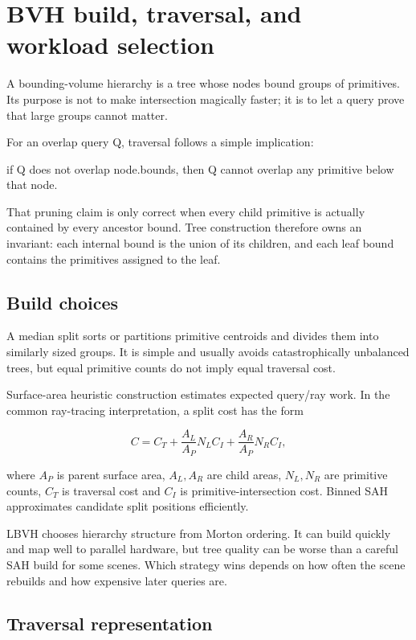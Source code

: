 \hypertarget{appendix-5653a7aea6bb}{}
\section{BVH build, traversal, and workload selection}\label{appendix-5653a7aea6bb-bvh-build-traversal-and-workload-selection}

A bounding-volume hierarchy is a tree whose nodes bound groups of primitives. Its purpose is not to make intersection magically faster; it is to let a query prove that large groups cannot matter.

For an overlap query Q, traversal follows a simple implication:

if Q does not overlap node.bounds, then Q cannot overlap any primitive below that node.

That pruning claim is only correct when every child primitive is actually contained by every ancestor bound. Tree construction therefore owns an invariant: each internal bound is the union of its children, and each leaf bound contains the primitives assigned to the leaf.

\subsection{Build choices}\label{appendix-5653a7aea6bb-build-choices}

A median split sorts or partitions primitive centroids and divides them into similarly sized groups. It is simple and usually avoids catastrophically unbalanced trees, but equal primitive counts do not imply equal traversal cost.

Surface-area heuristic construction estimates expected query/ray work. In the common ray-tracing interpretation, a split cost has the form

\[
C = C_T +
\frac{A_L}{A_P}N_L C_I +
\frac{A_R}{A_P}N_R C_I,
\]

where \(A_P\) is parent surface area, \(A_L,A_R\) are child areas, \(N_L,N_R\) are primitive counts, \(C_T\) is traversal cost and \(C_I\) is primitive-intersection cost. Binned SAH approximates candidate split positions efficiently.

LBVH chooses hierarchy structure from Morton ordering. It can build quickly and map well to parallel hardware, but tree quality can be worse than a careful SAH build for some scenes. Which strategy wins depends on how often the scene rebuilds and how expensive later queries are.

\subsection{Traversal representation}\label{appendix-5653a7aea6bb-traversal-representation}

